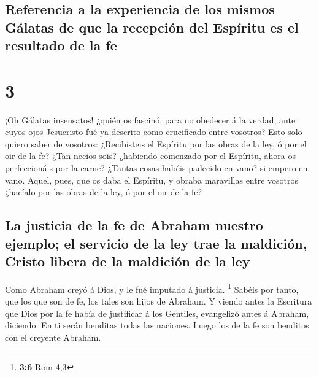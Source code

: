 \hypertarget{referencia-a-la-experiencia-de-los-mismos-guxe1latas-de-que-la-recepciuxf3n-del-espuxedritu-es-el-resultado-de-la-fe}{%
\subsection{Referencia a la experiencia de los mismos Gálatas de que la
recepción del Espíritu es el resultado de la
fe}\label{referencia-a-la-experiencia-de-los-mismos-guxe1latas-de-que-la-recepciuxf3n-del-espuxedritu-es-el-resultado-de-la-fe}}

\hypertarget{section-2}{%
\section{3}\label{section-2}}

 ¡Oh Gálatas insensatos! ¿quién os fascinó, para no
obedecer á la verdad, ante cuyos ojos Jesucristo fué ya descrito como
crucificado entre vosotros?  Esto solo quiero saber de
vosotros: ¿Recibisteis el Espíritu por las obras de la ley, ó por el oir
de la fe?  ¿Tan necios sois? ¿habiendo comenzado por el
Espíritu, ahora os perfeccionáis por la carne?  ¿Tantas
cosas habéis padecido en vano? si empero en vano.  Aquel,
pues, que os daba el Espíritu, y obraba maravillas entre vosotros
¿hacíalo por las obras de la ley, ó por el oir de la fe?

\hypertarget{la-justicia-de-la-fe-de-abraham-nuestro-ejemplo-el-servicio-de-la-ley-trae-la-maldiciuxf3n-cristo-libera-de-la-maldiciuxf3n-de-la-ley}{%
\subsection{La justicia de la fe de Abraham nuestro ejemplo; el servicio
de la ley trae la maldición, Cristo libera de la maldición de la
ley}\label{la-justicia-de-la-fe-de-abraham-nuestro-ejemplo-el-servicio-de-la-ley-trae-la-maldiciuxf3n-cristo-libera-de-la-maldiciuxf3n-de-la-ley}}

 Como Abraham creyó á Dios, y le fué imputado á justicia.
\footnote{\textbf{3:6} Rom 4,3}  Sabéis por tanto, que los
que son de fe, los tales son hijos de Abraham.  Y viendo
antes la Escritura que Dios por la fe había de justificar á los
Gentiles, evangelizó antes á Abraham, diciendo: En ti serán benditas
todas las naciones.  Luego los de la fe son benditos con
el creyente Abraham.

